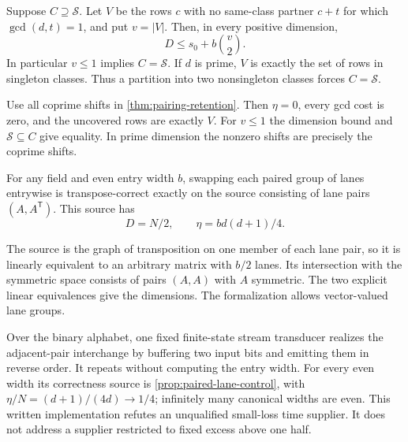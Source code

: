 \begin{corollary}\label{cor:coprime-retention}
Suppose $C\supseteq\mathcal S$. Let $V$ be the rows $c$ with no
same-class partner $c+t$ for which $\gcd(d,t)=1$, and put $v=|V|$.
Then, in every positive dimension,
\[
 D\le s_0+b\binom v2.
\]
In particular $v\le1$ implies $C=\mathcal S$. If $d$ is prime, $V$
is exactly the set of rows in singleton classes. Thus a partition into two
nonsingleton classes forces $C=\mathcal S$.
\end{corollary}
\begin{outline}
Use all coprime shifts in \cref{thm:pairing-retention}. Then $\eta=0$,
every gcd cost is zero, and the uncovered rows are exactly $V$. For
$v\le1$ the dimension bound and $\mathcal S\subseteq C$ give equality.
In prime dimension the nonzero shifts are precisely the coprime shifts.
\end{outline}

\begin{proposition}\label{prop:paired-lane-control}
For any field and even entry width $b$, swapping each paired group of
lanes entrywise is transpose-correct exactly on the source consisting of
lane pairs $(A,A^{\mathsf T})$. This source has
\[
 D=N/2,\qquad \eta=bd(d+1)/4.
\]
\end{proposition}
\begin{outline}
The source is the graph of transposition on one member of each lane pair,
so it is linearly equivalent to an arbitrary matrix with $b/2$ lanes.
Its intersection with the symmetric space consists of pairs $(A,A)$
with $A$ symmetric. The two explicit linear equivalences give the
dimensions. The formalization allows vector-valued lane groups.
\end{outline}

Over the binary alphabet, one fixed finite-state stream transducer realizes
the adjacent-pair interchange by buffering two input bits and emitting them
in reverse order. It repeats without computing the entry width. For every
even width its correctness source is \cref{prop:paired-lane-control}, with
$\eta/N=(d+1)/(4d)\to1/4$; infinitely many canonical widths are even.
This written implementation refutes an unqualified small-loss time supplier.
It does not address a supplier restricted to fixed excess above one half.
